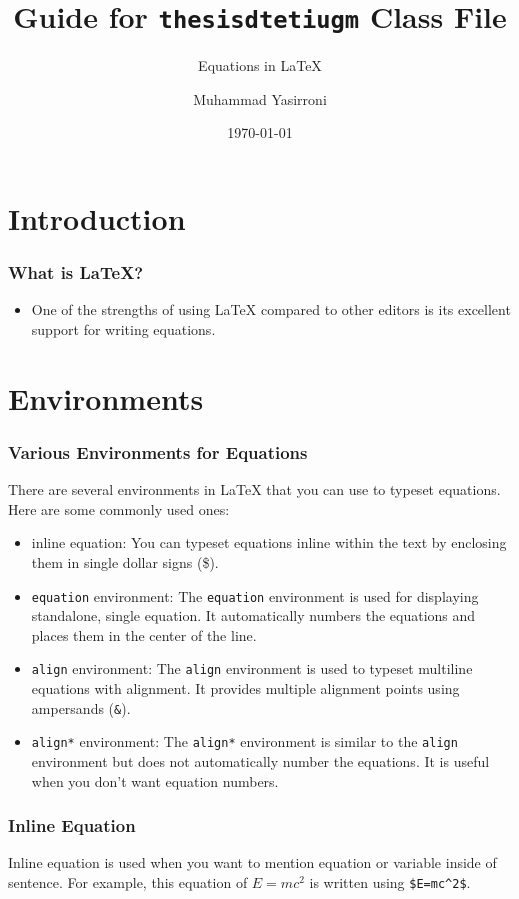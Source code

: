 \documentclass{beamer}
\title{Guide for \texttt{thesisdtetiugm} Class File}
\subtitle{Equations in LaTeX}
\author{Muhammad Yasirroni}
\institute{Universitas Gadjah Mada}
\date{\today}
\begin{document}
\begin{frame}
  \titlepage
\end{frame}

\section{Introduction}
\begin{frame}
  \frametitle{What is LaTeX?}
  \begin{itemize}
    \item One of the strengths of using LaTeX compared to other editors is its excellent support for writing equations.
  \end{itemize}
\end{frame}

\section{Environments}
\begin{frame}[fragile]
  \frametitle{Various Environments for Equations}
  There are several environments in LaTeX that you can use to typeset equations. Here are some commonly used ones:

  \begin{itemize}
    \item inline equation: You can typeset equations inline within the text by enclosing them in single dollar signs (\$).

    \item \texttt{equation} environment: The \texttt{equation} environment is used for displaying standalone, single equation. It automatically numbers the equations and places them in the center of the line.

    \item \texttt{align} environment: The \texttt{align} environment is used to typeset multiline equations with alignment. It provides multiple alignment points using ampersands (\verb|&|).

    \item \texttt{align*} environment: The \texttt{align*} environment is similar to the \texttt{align} environment but does not automatically number the equations. It is useful when you don't want equation numbers.

  \end{itemize}
\end{frame}

\begin{frame}[fragile]
  \frametitle{Inline Equation}
  Inline equation is used when you want to mention equation or variable inside of sentence. For example, this equation of $E=mc^2$ is written using \verb|$E=mc^2$|. 
\end{frame}
\end{document}
